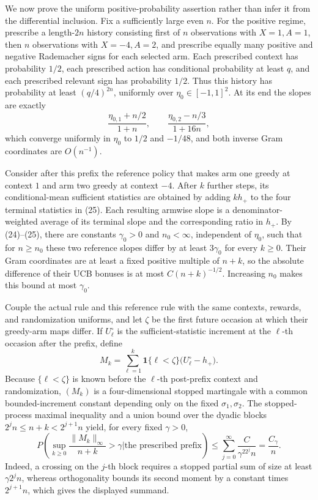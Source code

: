 We now prove the uniform positive-probability assertion rather than infer it from the differential inclusion.  Fix a sufficiently large even \(n\).  For the positive regime, prescribe a length-\(2n\) history consisting first of \(n\) observations with \(X=1,A=1\), then \(n\) observations with \(X=-4,A=2\), and prescribe equally many positive and negative Rademacher signs for each selected arm.  Each prescribed context has probability \(1/2\), each prescribed action has conditional probability at least \(q\), and each prescribed relevant sign has probability \(1/2\).  Thus this history has probability at least \((q/4)^{2n}\), uniformly over \(\eta_0\in[-1,1]^2\).  At its end the slopes are exactly
\[
 \frac{\eta_{0,1}+n/2}{1+n},\qquad
 \frac{\eta_{0,2}-n/3}{1+16n}, \tag{25}
\]
which converge uniformly in \(\eta_0\) to \(1/2\) and \(-1/48\), and both inverse Gram coordinates are \(O(n^{-1})\).

Consider after this prefix the reference policy that makes arm one greedy at context \(1\) and arm two greedy at context \(-4\).  After \(k\) further steps, its conditional-mean sufficient statistics are obtained by adding \(kh_+\) to the four terminal statistics in (25).  Each resulting armwise slope is a denominator-weighted average of its terminal slope and the corresponding ratio in \(h_+\).  By (24)--(25), there are constants \(\gamma_0>0\) and \(n_0<\infty\), independent of \(\eta_0\), such that for \(n\geq n_0\) these two reference slopes differ by at least \(3\gamma_0\) for every \(k\geq0\).  Their Gram coordinates are at least a fixed positive multiple of \(n+k\), so the absolute difference of their UCB bonuses is at most \(C(n+k)^{-1/2}\).  Increasing \(n_0\) makes this bound at most \(\gamma_0\).

Couple the actual rule and this reference rule with the same contexts, rewards, and randomization uniforms, and let \(\zeta\) be the first future occasion at which their greedy-arm maps differ.  If \(U^{\circ}_\ell\) is the sufficient-statistic increment at the \(\ell\)-th occasion after the prefix, define
\[
 M_k=\sum_{\ell=1}^k\mathbf 1\{\ell<\zeta\}\bigl(U^{\circ}_\ell-h_+\bigr).
\]
Because \(\{\ell<\zeta\}\) is known before the \(\ell\)-th post-prefix context and randomization, \((M_k)\) is a four-dimensional stopped martingale with a common bounded-increment constant depending only on the fixed \(\sigma_1,\sigma_2\).  The stopped-process maximal inequality and a union bound over the dyadic blocks \(2^jn\leq n+k<2^{j+1}n\) yield, for every fixed \(\gamma>0\),
\[
 P\left(\sup_{k\geq0}\frac{\|M_k\|_\infty}{n+k}>\gamma
 \mathrel{\Big|}\text{the prescribed prefix}\right)
 \leq \sum_{j=0}^{\infty}\frac{C}{\gamma^22^jn}
 =\frac{C_\gamma}{n}. \tag{26}
\]
Indeed, a crossing on the \(j\)-th block requires a stopped partial sum of size at least \(\gamma2^jn\), whereas orthogonality bounds its second moment by a constant times \(2^{j+1}n\), which gives the displayed summand.

